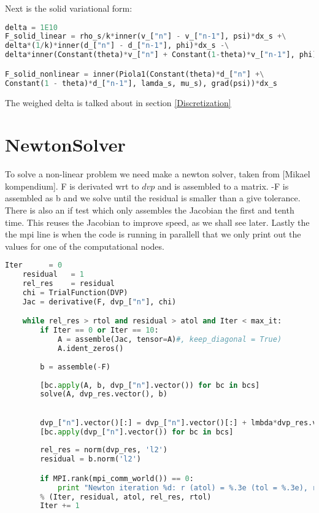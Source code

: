 Next is the solid variational form:
\begin{lstlisting}[language=Python, basicstyle=\small]
delta = 1E10
F_solid_linear = rho_s/k*inner(v_["n"] - v_["n-1"], psi)*dx_s +\
delta*(1/k)*inner(d_["n"] - d_["n-1"], phi)*dx_s -\
delta*inner(Constant(theta)*v_["n"] + Constant(1-theta)*v_["n-1"], phi)*dx_s

F_solid_nonlinear = inner(Piola1(Constant(theta)*d_["n"] +\
Constant(1 - theta)*d_["n-1"], lamda_s, mu_s), grad(psi))*dx_s
\end{lstlisting}

The weighed delta is talked about in section \ref{Discretization}

\section{NewtonSolver}
To solve a non-linear problem we need make a newton solver, taken from [Mikael kompendium]. F is derivated wrt to $dvp$ and is assembled to a matrix. -F is assembled as b and we solve until the residual is smaller than a give tolerance. There is also an if test which only assembles the Jacobian the first and tenth time. This reuses the Jacobian to improve speed, as we shall see later. Lastly the the mpi line is when the code is running in parallell that we only print out the values for one of the computational nodes.  
\begin{lstlisting}[language=Python, basicstyle=\small]
    Iter      = 0
    residual   = 1
    rel_res    = residual
    chi = TrialFunction(DVP)
    Jac = derivative(F, dvp_["n"], chi)

    while rel_res > rtol and residual > atol and Iter < max_it:
        if Iter == 0 or Iter == 10:
            A = assemble(Jac, tensor=A)#, keep_diagonal = True)
            A.ident_zeros()
            
        b = assemble(-F)
        
        [bc.apply(A, b, dvp_["n"].vector()) for bc in bcs]
        solve(A, dvp_res.vector(), b)
                   

        dvp_["n"].vector()[:] = dvp_["n"].vector()[:] + lmbda*dvp_res.vector()[:]
        [bc.apply(dvp_["n"].vector()) for bc in bcs]
        
        rel_res = norm(dvp_res, 'l2')
        residual = b.norm('l2')

        if MPI.rank(mpi_comm_world()) == 0:
            print "Newton iteration %d: r (atol) = %.3e (tol = %.3e), r (rel) = %.3e (tol = %.3e) " \
        % (Iter, residual, atol, rel_res, rtol)
        Iter += 1
\end{lstlisting}


